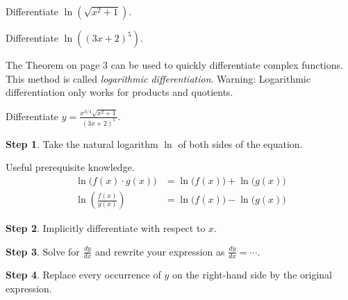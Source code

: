 \documentclass[../main.tex]{subfiles}
\begin{document}
\begin{example}
  Differentiate \(\ln(\sqrt{x^{2}+1})\).
\end{example}
\vfill

\begin{example}
  Differentiate \(\ln((3x+2)^{5})\).
\end{example}
\vfill

\clearpage
The Theorem on page 3 can be used to quickly differentiate complex functions. This method is called \emph{logarithmic differentiation}. \faExclamationTriangle{} Warning: Logarithmic differentiation only works for products and quotients.


\begin{example}
  Differentiate \(y = \frac{x^{3/4} \sqrt{x^{2}+1}}{(3x + 2)^{5}}\).
\end{example}
\textbf{Step 1}. Take the natural logarithm \(\ln\) of both sides of the equation.

\begin{mdframed}[style=sidenote, userdefinedwidth=.5\textwidth]
Useful prerequisite knowledge. 
\begin{align} 
  \ln\big(f(x) \cdot g(x)\big) &= \ln\big(f(x)\big) + \ln\big(g(x)\big) \\
  \ln\left(\frac{f(x)}{g(x)}\right) &= \ln\big(f(x)\big) - \ln\big(g(x)\big) 
\end{align}
\end{mdframed}
\vspace{1in}

\textbf{Step 2}. Implicitly differentiate with respect to \(x\).
\vfill

\textbf{Step 3}. Solve for \(\frac{dy}{dx}\) and rewrite your expression as \(\frac{dy}{dx} = \cdots\). 
\vspace{1in}

\textbf{Step 4}. Replace every occurrence of \(y\) on the right-hand side by the original expression.
\vspace{1in}
\clearpage
\phantom{blank page}

\clearpage
\phantom{blank page}
\end{document}
